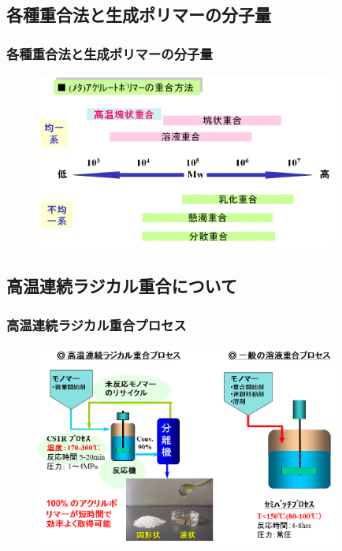 \documentclass[12pt, dvipdfmx]{beamer}
\begin{document}
\subsection{各種重合法と生成ポリマーの分子量}

\begin{frame}\frametitle{各種重合法と生成ポリマーの分子量}
\begin{figure}[!b]
	\begin{center}
		\includegraphics[width=100mm]{jyuugou_hou.png}
	\end{center}
\end{figure}
\end{frame}

\subsection{高温連続ラジカル重合について}
\begin{frame}\frametitle{高温連続ラジカル重合プロセス}
\begin{figure}[!b]
	\begin{center}
		\includegraphics[width=100mm]{hikaku.png}
	\end{center}
\end{figure}
\end{frame}

\end{document}
